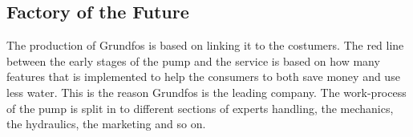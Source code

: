 \subsection{Factory of the Future}

The production of Grundfos is based on linking it to the costumers. The red line between the early stages of the pump and the service is based on how many features that is implemented to help the consumers to both save money and use less water. This is the reason Grundfos is the leading company.
The work-process of the pump is split in to different sections of experts handling, the mechanics, the hydraulics, the marketing and so on.\\


